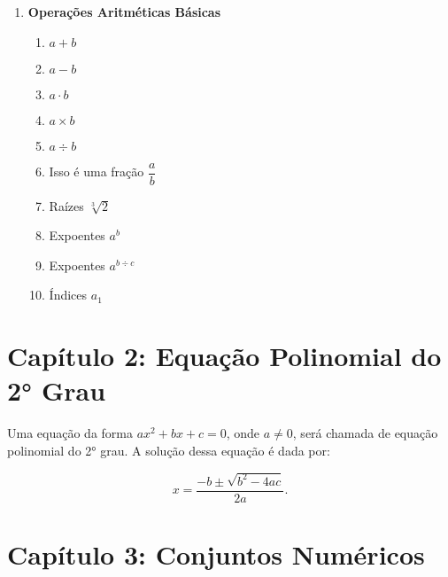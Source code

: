 \documentclass[a4paper, 12pt]{article}
\begin{document}
\begin{enumerate}
    \item \textbf{Operações Aritméticas Básicas}
    \begin{enumerate}
        \item $a + b$
        \item $a - b$
        \item $a \cdot b$
        \item $a \times b$
        \item $a \div b$
        \item Isso é uma fração $\dfrac{a}{b}$
        \item Raízes $\sqrt[3]{2}$
        \item Expoentes $a^b$
        \item Expoentes $a^{b \div c}$
        \item Índices $a_1$
    \end{enumerate}
    
\end{enumerate}

\section*{Capítulo 2: Equação Polinomial do 2° Grau}

\begin{flushleft}
    Uma equação da forma $ax^2 + bx + c = 0$, onde $a \neq 0$, será chamada de equação polinomial do 2° grau.
    A solução dessa equação é dada por:
\end{flushleft}


\[x = \frac{-b \pm \sqrt{b^2 - 4ac}}{2a}.\]

\section*{Capítulo 3: Conjuntos Numéricos}
\end{document}
